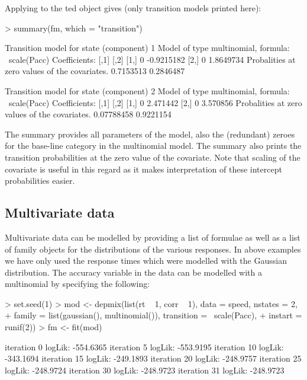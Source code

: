\documentclass[article]{jss}
\begin{document}
Applying  to the ted object gives (only
transition models printed here):
\begin{Schunk}
\begin{Sinput}
> summary(fm, which = "transition")
\end{Sinput}
\begin{Soutput}
Transition model for state (component) 1 
Model of type multinomial, formula: ~scale(Pacc)
Coefficients: 
     [,1]       [,2]
[1,]    0 -0.9215182
[2,]    0  1.8649734
Probalities at zero values of the covariates.
0.7153513 0.2846487 

Transition model for state (component) 2 
Model of type multinomial, formula: ~scale(Pacc)
Coefficients: 
     [,1]     [,2]
[1,]    0 2.471442
[2,]    0 3.570856
Probalities at zero values of the covariates.
0.07788458 0.9221154 
\end{Soutput}
\end{Schunk}

The summary provides all parameters of the model, also the (redundant)
zeroes for the base-line category in the multinomial model.  The
summary also prints the transition probabilities at the zero value of
the covariate.  Note that scaling of the covariate is useful in this
regard as it makes interpretation of these intercept probabilities
easier.

\subsection{Multivariate data}

Multivariate data can be modelled by providing a list of formulae as
well as a list of family objects for the distributions of the various
responses.  In above examples we have only used the response times
which were modelled with the Gaussian distribution.  The accuracy
variable in the  data can be modelled with a multinomial
by specifying the following:
\begin{Schunk}
\begin{Sinput}
> set.seed(1)
> mod <- depmix(list(rt ~ 1, corr ~ 1), data = speed, nstates = 2, 
+     family = list(gaussian(), multinomial()), transition = ~scale(Pacc), 
+     instart = runif(2))
> fm <- fit(mod)
\end{Sinput}
\begin{Soutput}
iteration 0 logLik: -554.6365 
iteration 5 logLik: -553.9195 
iteration 10 logLik: -343.1694 
iteration 15 logLik: -249.1893 
iteration 20 logLik: -248.9757 
iteration 25 logLik: -248.9724 
iteration 30 logLik: -248.9723 
iteration 31 logLik: -248.9723 
\end{Soutput}
\end{Schunk}
\end{document}

